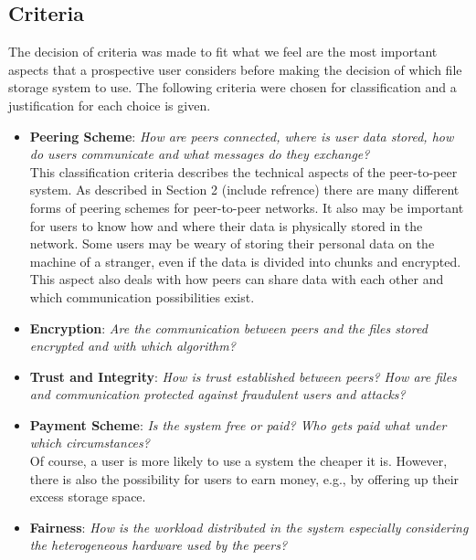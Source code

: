 \subsection{Criteria}
The decision of criteria was made to fit what we feel are the most important aspects that a prospective user considers before making the decision of which file storage system to use. The following criteria were chosen for classification and a justification for each choice is given.

\begin{itemize}
\item \textbf{Peering Scheme}: \textit{How are peers connected, where is user data stored, how do users communicate and what messages do they exchange?}\\
This classification criteria describes the technical aspects of the peer-to-peer system. As described in Section 2 (include refrence) there are many different forms of peering schemes for peer-to-peer networks. It also may be important for users to know how and where their data is physically stored in the network. Some users may be weary of storing their personal data on the machine of a stranger, even if the data is divided into chunks and encrypted. This aspect also deals with how peers can share data with each other and which communication possibilities exist. 

\item \textbf{Encryption}: \textit{Are the communication between peers and the files stored encrypted and with which algorithm?}\\

\item \textbf{Trust and Integrity}: \textit{How is trust established between peers? How are files and communication protected against fraudulent users and attacks?}\\

\item \textbf{Payment Scheme}: \textit{Is the system free or paid? Who gets paid what under which circumstances?}\\
Of course, a user is more likely to use a system the cheaper it is. However, there is also the possibility for users to earn money, e.g., by offering up their excess storage space.

\item \textbf{Fairness}: \textit{How is the workload distributed in the system especially considering the heterogeneous hardware used by the peers?}\\


\end{itemize}
